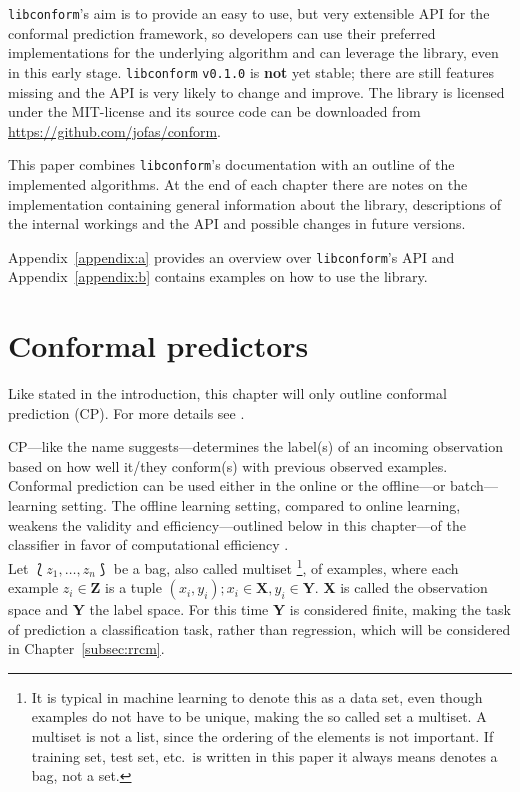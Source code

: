 \documentclass[twoside,11pt]{article}
\def\version{\texttt{v0.1.0}}
\def\libconform{\texttt{libconform}}
\begin{document}
\libconform's aim is to provide an easy to use, but very
extensible API for the conformal prediction framework, so
developers can use their preferred implementations for the
underlying algorithm and can leverage the library, even in
this early stage.
\libconform{} \version{} is \textbf{not} yet stable; there
are still features missing and the API is very likely to
change and improve.
The library is licensed under the MIT-license and its
source code can be downloaded from
\url{https://github.com/jofas/conform}.

This paper combines \libconform{}'s documentation with an
outline of the implemented algorithms.
At the end of each chapter there are notes on the
implementation containing general information about the
library, descriptions of the internal workings and the API
and possible changes in future versions.

Appendix~\ref{appendix:a} provides an overview over
\libconform's API and Appendix~\ref{appendix:b} contains
examples on how to use the library.

\section{Conformal predictors}
\label{sec:cp}

Like stated in the introduction, this chapter will only
outline conformal prediction (CP). For more details see
\citet{alrw}.

CP---like the name suggests---determines the label(s) of an
incoming observation based on how well it/they conform(s)
with previous observed examples. Conformal prediction can
be used either in the online or the offline---or
batch---learning setting.
The offline learning setting, compared to online learning,
weakens the validity and efficiency---outlined below in
this chapter---of the classifier in favor of computational
efficiency \citep[see][Chapter 4]{alrw}.
\\

\noindent
Let $\Lbag z_1,\dots,z_n \Rbag$ be a bag, also called
multiset%
\footnote{It is typical in machine learning to denote this
as a data set, even though examples do not have to
be unique, making the so called set a multiset. A multiset
is not a list, since the ordering of the elements is not
important. If training set, test set, etc.\ is written in
this paper it always means denotes a bag, not a set.},
of examples, where each example $z_i \in \textbf{Z}$ is a
tuple $(x_i,y_i); x_i \in \textbf{X}, y_i \in \textbf{Y}$.
\textbf{X} is called the observation space and \textbf{Y}
the label space. For this time \textbf{Y} is considered
finite, making the task of prediction a classification
task, rather than regression, which will be considered in
Chapter~\ref{subsec:rrcm}.
\end{document}
